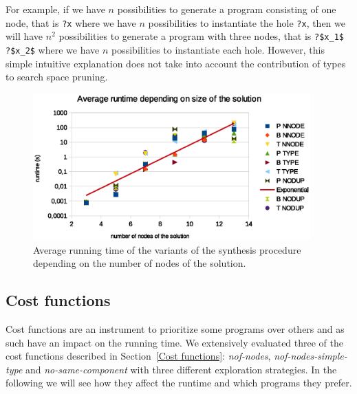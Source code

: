 For example, if we have $n$ possibilities to generate a program consisting of one node, that is \lstinline!?x! where we have $n$ possibilities to instantiate the hole \lstinline!?x!, then we will have $n^2$ possibilities to generate a program with three nodes, that is \lstinline!?$x_1$ ?$x_2$! where we have $n$ possibilities to instantiate each hole. However, this simple intuitive explanation does not take into account the contribution of types to search space pruning.

\begin{figure}
    \centering
    \includegraphics[width=0.95\textwidth]{time_vs_nof_nodes.eps}
    \caption{Average running time of the variants of the synthesis procedure depending on the number of nodes of the solution.}
    \label{fig:runtime_vs_nof_nodes}
\end{figure}

\subsection{Cost functions}\label{Eval. Cost functions}
Cost functions are an instrument to prioritize some programs over others and as such have an impact on the running time. We extensively evaluated three of the cost functions described in Section~\ref{Cost functions}: \textit{nof-nodes}, \textit{nof-nodes-simple-type} and \textit{no-same-component} with three different exploration strategies. In the following we will see how they affect the runtime and which programs they prefer.

